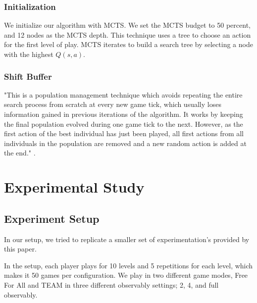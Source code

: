 \documentclass{report}
\begin{document}
	 \subsection {Initialization}
    We initialize our algorithm with MCTS. We set the MCTS budget to 50 percent, and 12 nodes as the MCTS depth. This technique uses a tree to choose an action for the first level of play. MCTS iterates to build a search tree by selecting a node with the highest $Q(s,a)$.

	 \subsection  {Shift Buffer}
	 "This is a population management technique which avoids
    repeating the entire search process from scratch at every
    new game tick, which usually loses information gained in
    previous iterations of the algorithm. It works by keeping the final population evolved during
    one game tick to the next. However, as the first action of
    the best individual has just been played, all first actions from
    all individuals in the population are removed and a new
    random action is added at the end." \cite{gaina2021rolling}.
	\chapter{Experimental Study}
	\section{Experiment Setup}
	In our setup, we tried to replicate a smaller set of experimentation's provided by this paper\cite{perez2019analysis}.

	In the setup, each player plays for 10 levels and 5 repetitions for each level, which makes it 50 games per configuration. We play in two different game modes, Free For All and TEAM in three different observably settings; 2, 4, and full observably.
\end{document}
